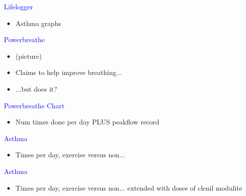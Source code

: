 \documentclass[landscape]{slides}
\begin{document}
\begin{slide}

    \textcolor{blue}{\Large{Lifelogger}}

    \begin{itemize}
        \item Asthma graphs
    \end{itemize}

\end{slide}




\begin{slide}

    \textcolor{blue}{\Large{Powerbreathe}}

    \begin{itemize}
        \item (picture)
        \item Claims to help improve breathing...
        \item ...but does it?
    \end{itemize}

\end{slide}



\begin{slide}

    \textcolor{blue}{\Large{Powerbreathe Chart}}

    \begin{itemize}
        \item Num times done per day PLUS peakflow record
    \end{itemize}


\end{slide}



\begin{slide}

    \textcolor{blue}{\Large{Asthma}}

    \begin{itemize}
        \item Times per day, exercise versus non...
    \end{itemize}


\end{slide}


\begin{slide}

    \textcolor{blue}{\Large{Asthma}}

    \begin{itemize}
        \item Times per day, exercise versus non... extended with doses of clenil modulite
    \end{itemize}


\end{slide}
\end{document}
